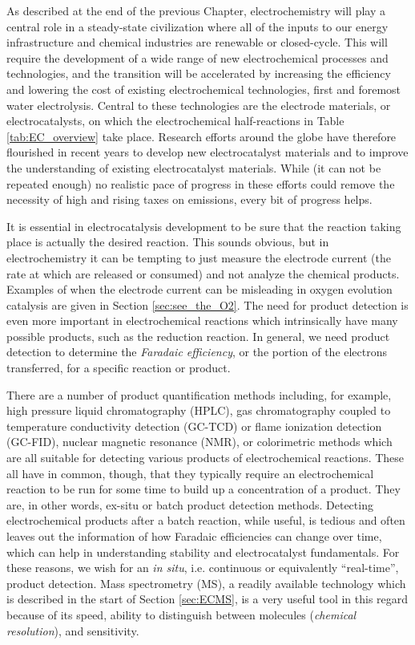 As described at the end of the previous Chapter, electrochemistry will play a central role in a steady-state civilization where all of the inputs to our energy infrastructure and chemical industries are renewable or closed-cycle. This will require the development of a wide range of new electrochemical processes and technologies, and the transition will be accelerated by increasing the efficiency and lowering the cost of existing electrochemical technologies, first and foremost water electrolysis. Central to these technologies are the electrode materials, or electrocatalysts, on which the electrochemical half-reactions in Table \ref{tab:EC_overview} take place. Research efforts around the globe have therefore flourished in recent years to develop new electrocatalyst materials and to improve the understanding of existing electrocatalyst materials\cite{Lewis2007, Chu2016, Seh2017}. While (it can not be repeated enough) no realistic pace of progress in these efforts could remove the necessity of high and rising taxes on  emissions, every bit of progress helps.

It is essential in electrocatalysis development to be sure that the reaction taking place is actually the desired reaction. This sounds obvious, but in electrochemistry it can be tempting to just measure the electrode current (the rate at which  are released or consumed) and not analyze the chemical products. Examples of when the electrode current can be misleading in oxygen evolution catalysis are given in Section \ref{sec:see_the_O2}. The need for product detection is even more important in electrochemical reactions which intrinsically have many possible products, such as the  reduction reaction\cite{Nitopi2019}. In general, we need product detection to determine the \textit{Faradaic efficiency}, or the portion of the electrons transferred, for a specific reaction or product.

There are a number of product quantification methods including, for example, high pressure liquid chromatography (HPLC), gas chromatography coupled to temperature conductivity detection (GC-TCD) or flame ionization detection (GC-FID), nuclear magnetic resonance (NMR), or colorimetric methods which are all suitable for detecting various products of electrochemical reactions. These all have in common, though, that they typically require an electrochemical reaction to be run for some time to build up a concentration of a product. They are, in other words, ex-situ or batch product detection methods. Detecting electrochemical products after a batch reaction, while useful, is tedious and often leaves out the information of how Faradaic efficiencies can change over time, which can help in understanding stability and electrocatalyst fundamentals. For these reasons, we wish for an \textit{in situ}, i.e. continuous or equivalently ``real-time'', product detection. Mass spectrometry (MS), a readily available technology which is described in the start of Section \ref{sec:ECMS}, is a very useful tool in this regard because of its speed, ability to distinguish between molecules (\textit{chemical resolution}), and sensitivity.

